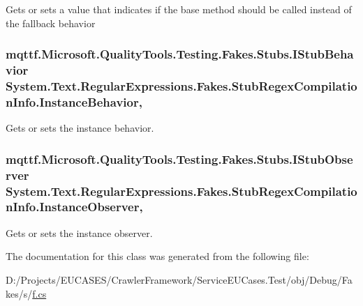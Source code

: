 Gets or sets a value that indicates if the base method should be called instead of the fallback behavior

\hypertarget{class_system_1_1_text_1_1_regular_expressions_1_1_fakes_1_1_stub_regex_compilation_info_aac761da273158188876a129eef588fa7}{
\subsubsection[{Instance\-Behavior}]{\setlength{\rightskip}{0pt plus 5cm}mqttf.\-Microsoft.\-Quality\-Tools.\-Testing.\-Fakes.\-Stubs.\-I\-Stub\-Behavior System.\-Text.\-Regular\-Expressions.\-Fakes.\-Stub\-Regex\-Compilation\-Info.\-Instance\-Behavior\hspace{0.3cm}{\ttfamily [get]}, {\ttfamily [set]}}}\label{class_system_1_1_text_1_1_regular_expressions_1_1_fakes_1_1_stub_regex_compilation_info_aac761da273158188876a129eef588fa7}


Gets or sets the instance behavior.

\hypertarget{class_system_1_1_text_1_1_regular_expressions_1_1_fakes_1_1_stub_regex_compilation_info_a4681a1b438c09a45ef16326e7c9cc158}{
\subsubsection[{Instance\-Observer}]{\setlength{\rightskip}{0pt plus 5cm}mqttf.\-Microsoft.\-Quality\-Tools.\-Testing.\-Fakes.\-Stubs.\-I\-Stub\-Observer System.\-Text.\-Regular\-Expressions.\-Fakes.\-Stub\-Regex\-Compilation\-Info.\-Instance\-Observer\hspace{0.3cm}{\ttfamily [get]}, {\ttfamily [set]}}}\label{class_system_1_1_text_1_1_regular_expressions_1_1_fakes_1_1_stub_regex_compilation_info_a4681a1b438c09a45ef16326e7c9cc158}


Gets or sets the instance observer.



The documentation for this class was generated from the following file\-:\begin{DoxyCompactItemize}
\item 
D\-:/\-Projects/\-E\-U\-C\-A\-S\-E\-S/\-Crawler\-Framework/\-Service\-E\-U\-Cases.\-Test/obj/\-Debug/\-Fakes/s/\hyperlink{s_2f_8cs}{f.\-cs}\end{DoxyCompactItemize}
